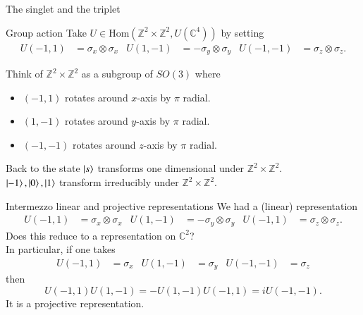 \documentclass{beamer}
\newcommand{\CC}{\mathbb{C}}
\newcommand{\ZZ}{\mathbb{Z}}
\begin{document}
\begin{frame}{The singlet and the triplet}
	\begin{block}{Group action}
		Take $U\in \textrm{Hom}(\ZZ^2\times \ZZ^2,U(\CC^4))$ by setting
		\begin{align*}
		U(-1,1)&=\sigma_x\otimes \sigma_x&U(1,-1)&=-\sigma_y\otimes \sigma_y&U(-1,-1)&=\sigma_z\otimes \sigma_z.
		\end{align*}
	\end{block}
	Think of $\ZZ^2\times \ZZ^2$ as a subgroup of $SO(3)$ where
	\begin{itemize}
		\item $(-1,1)$ rotates around $x$-axis by $\pi$ radial.
		\item $(1,-1)$ rotates around $y$-axis by $\pi$ radial.
		\item $(-1,-1)$ rotates around $z$-axis by $\pi$ radial.
	\end{itemize}
	\pause
	\begin{block}{Back to the state}
		$\ket{s}$ transforms one dimensional under $\ZZ^2\times \ZZ^2$.\\
		$\ket{-1},\ket{0},\ket{1}$ transform irreducibly under $\ZZ^2\times \ZZ^2$.
	\end{block}
\end{frame}

\begin{frame}{Intermezzo linear and projective representations}
	We had a (linear) representation
	\begin{align*}
			U(-1,1)&=\sigma_x\otimes \sigma_x&U(1,-1)&=-\sigma_y\otimes \sigma_y&U(-1,1)&=\sigma_z\otimes \sigma_z.
	\end{align*}
	\pause
	Does this reduce to a representation on $\CC^2$?\\
	\pause
	In particular, if one takes
	\begin{align}
		U(-1,1)&=\sigma_x&U(1,-1)&=\sigma_y&U(-1,-1)&=\sigma_z
	\end{align}
	then
	\begin{equation}
		U(-1,1)U(1,-1)=-U(1,-1)U(-1,1)=i U(-1,-1).
	\end{equation}
	It is a projective representation.
\end{frame}
\end{document}
